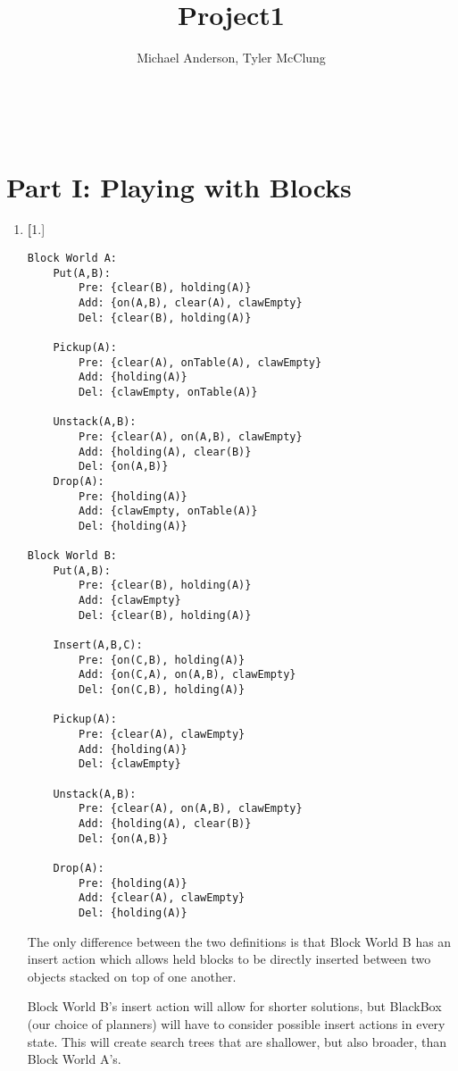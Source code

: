 \documentclass{article}
\author{Michael Anderson, Tyler McClung}
\title{Project1}
\begin{document}
\maketitle
{}
\\
\flushleft
\newpage

\section{Part I: Playing with Blocks}

\begin{enumerate}
\item{\textbf[1.]}

\begin{verbatim}
Block World A:
    Put(A,B):
        Pre: {clear(B), holding(A)}
        Add: {on(A,B), clear(A), clawEmpty}
        Del: {clear(B), holding(A)}

    Pickup(A):
        Pre: {clear(A), onTable(A), clawEmpty}
        Add: {holding(A)}
        Del: {clawEmpty, onTable(A)}

    Unstack(A,B):
        Pre: {clear(A), on(A,B), clawEmpty}
        Add: {holding(A), clear(B)}
        Del: {on(A,B)}
    Drop(A):
        Pre: {holding(A)}
        Add: {clawEmpty, onTable(A)}
        Del: {holding(A)}

Block World B:
    Put(A,B):
        Pre: {clear(B), holding(A)}
        Add: {clawEmpty}
        Del: {clear(B), holding(A)}

    Insert(A,B,C):
        Pre: {on(C,B), holding(A)}
        Add: {on(C,A), on(A,B), clawEmpty}
        Del: {on(C,B), holding(A)}

    Pickup(A):
        Pre: {clear(A), clawEmpty}
        Add: {holding(A)}
        Del: {clawEmpty}

    Unstack(A,B):
        Pre: {clear(A), on(A,B), clawEmpty}
        Add: {holding(A), clear(B)}
        Del: {on(A,B)}

    Drop(A):
        Pre: {holding(A)}
        Add: {clear(A), clawEmpty}
        Del: {holding(A)}
\end{verbatim}

The only difference between the two definitions is that Block World B
has an insert action which allows held blocks to be directly inserted
between two objects stacked on top of one another.

Block World B's insert action will allow for shorter solutions, but
BlackBox (our choice of planners) will have to consider possible
insert actions in every state. This will create search trees that are
shallower, but also broader, than Block World A's.


\end{enumerate}
\end{document}
